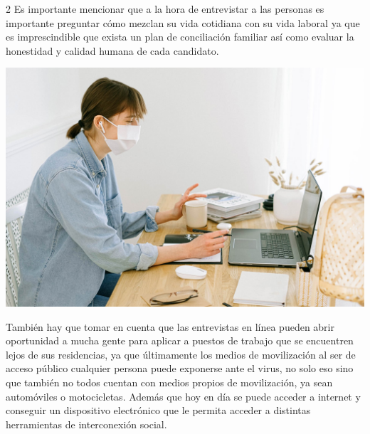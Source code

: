 \documentclass[12pt,spanish,Letterpaper,openany]{book}
\begin{document}
\begin {multicols}{2}
Es importante mencionar que a la hora de entrevistar a las personas es importante preguntar cómo mezclan su vida cotidiana con su vida laboral ya que es imprescindible que exista un plan de conciliación familiar así como evaluar la honestidad y calidad humana de cada candidato.

\begin {flushleft}
\noindent\begin{minipage}[c]{\columnwidth}
\centering

\includegraphics[width=1\linewidth]{images/pareja36_image2}

\end{minipage}
\end {flushleft}

También hay que tomar en cuenta que las entrevistas en línea pueden abrir oportunidad a mucha gente para aplicar a puestos de trabajo que se encuentren lejos de sus residencias, ya que últimamente los medios de movilización al ser de acceso público cualquier persona puede exponerse ante el virus, no solo eso sino que también no todos cuentan con medios propios de movilización, ya sean automóviles o motocicletas. Además que hoy en día se puede acceder a internet y conseguir un dispositivo electrónico que le permita acceder a distintas herramientas de interconexión social.

\begin {flushleft}
\noindent\begin{minipage}[c]{\columnwidth}
\centering


\end{minipage}
\end{flushleft}
\end{multicols}
\end{document}
